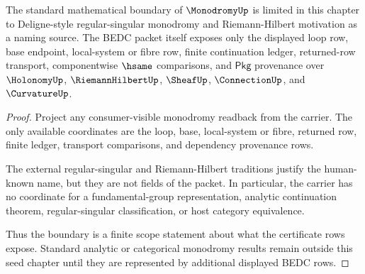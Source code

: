 \begin{theorem}
\label{thm:monodromy-standard-boundary-scope}
The standard mathematical boundary of $\MonodromyUp$ is limited in this chapter to Deligne-style regular-singular monodromy and Riemann-Hilbert motivation as a naming source. The BEDC packet itself exposes only the displayed loop row, base endpoint, local-system or fibre row, finite continuation ledger, returned-row transport, componentwise $\hsame$ comparisons, and $\mathsf{Pkg}$ provenance over $\HolonomyUp$, $\RiemannHilbertUp$, $\SheafUp$, $\ConnectionUp$, and $\CurvatureUp$.
\end{theorem}
\begin{proof}
Project any consumer-visible monodromy readback from the carrier. The only available coordinates are the loop, base, local-system or fibre, returned row, finite ledger, transport comparisons, and dependency provenance rows.

The external regular-singular and Riemann-Hilbert traditions justify the human-known name, but they are not fields of the packet. In particular, the carrier has no coordinate for a fundamental-group representation, analytic continuation theorem, regular-singular classification, or host category equivalence.

Thus the boundary is a finite scope statement about what the certificate rows expose. Standard analytic or categorical monodromy results remain outside this seed chapter until they are represented by additional displayed BEDC rows.
\end{proof}

